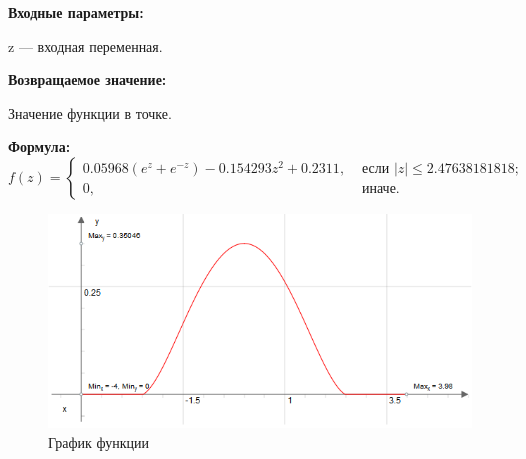 \textbf{Входные параметры:}
 
z --- входная переменная.

\textbf{Возвращаемое значение:}
 
Значение функции в точке.

\textbf{Формула:}
\begin{equation*}
f\left(z \right)=\left\lbrace \begin{aligned} 0.05968\left( e^z+e^{-z}\right) -0.154293 z^2+0.2311,& \text{ если } \left| z\right|\leq 2.47638181818 ; \\ 0,& \text{ иначе}. \end{aligned}\right.
\end{equation*}

 \begin{figure} [h] 
   \center
   \includegraphics {HML_BellShapedKernelExp_Graph.png}
   \caption{График функции} 
   \label{img:HML_BellShapedKernelExp_Graph}  
 \end{figure}
